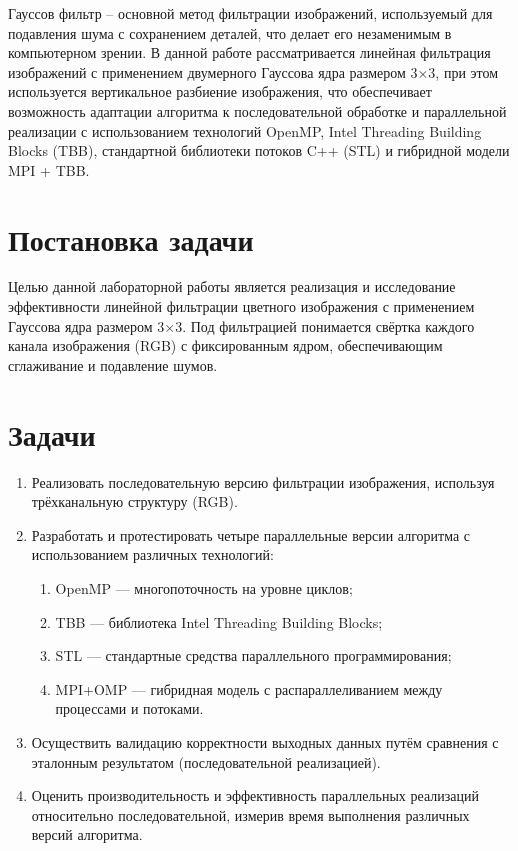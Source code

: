 \documentclass[12pt]{article}
\begin{document}
Гауссов фильтр – основной метод фильтрации изображений, используемый для подавления шума с сохранением деталей, что делает его незаменимым в компьютерном зрении.
В данной работе рассматривается линейная фильтрация изображений с применением двумерного Гауссова ядра размером 3×3, при этом используется вертикальное разбиение изображения, что обеспечивает возможность адаптации алгоритма к последовательной обработке и параллельной реализации с использованием технологий OpenMP, Intel Threading Building Blocks (TBB), стандартной библиотеки потоков C++ (STL) и гибридной модели MPI + TBB.

\section*{Постановка задачи}

Целью данной лабораторной работы является реализация и исследование эффективности линейной фильтрации цветного изображения с применением Гауссова ядра размером 3×3. Под фильтрацией понимается свёртка каждого канала изображения (RGB) с фиксированным ядром, обеспечивающим сглаживание и подавление шумов.

\section*{Задачи}

\begin{enumerate}
  \item Реализовать последовательную версию фильтрации изображения, используя трёхканальную структуру (RGB).
  
  \item Разработать и протестировать четыре параллельные версии алгоритма с использованием различных технологий:
  \begin{enumerate}
    \item OpenMP — многопоточность на уровне циклов;
    \item TBB — библиотека Intel Threading Building Blocks;
    \item STL — стандартные средства параллельного программирования;
    \item MPI+OMP — гибридная модель с распараллеливанием между процессами и потоками.
  \end{enumerate}
  
  \item Осуществить валидацию корректности выходных данных путём сравнения с эталонным результатом (последовательной реализацией).
  
  \item Оценить производительность и эффективность параллельных реализаций относительно последовательной, измерив время выполнения различных версий алгоритма.
\end{enumerate}
\end{document}
